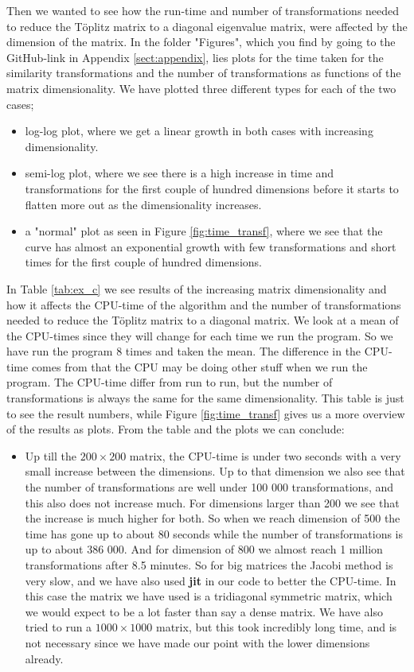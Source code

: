 \documentclass[12pt,a4paper,english]{article}
\begin{document}
Then we wanted to see how the run-time and number of transformations needed to reduce the Töplitz matrix to a diagonal eigenvalue matrix, were affected by the dimension of the matrix. In the folder "Figures", which you find by going to the GitHub-link in Appendix \ref{sect:appendix}, lies plots for the time taken for the similarity transformations and the number of transformations as functions of the matrix dimensionality. We have plotted three different types for each of the two cases; 
\begin{itemize}
	\item log-log plot, where we get a linear growth in both cases with increasing dimensionality.
	\item semi-log plot, where we see there is a high increase in time and transformations for the first couple of hundred dimensions before it starts to flatten more out as the dimensionality increases.
	\item a "normal" plot as seen in Figure \ref{fig:time_transf}, where we see that the curve has almost an exponential growth with few transformations and short times for the first couple of hundred dimensions.
\end{itemize}
In Table \ref{tab:ex_c} we see results of the increasing matrix dimensionality and how it affects the CPU-time of the algorithm and the number of transformations needed to reduce the Töplitz matrix to a diagonal matrix. We look at a mean of the CPU-times since they will change for each time we run the program. So we have run the program 8 times and taken the mean. The difference in the CPU-time comes from that the CPU may be doing other stuff when we run the program. The CPU-time differ from run to run, but the number of transformations is always the same for the same dimensionality. This table is just to see the result numbers, while Figure \ref{fig:time_transf} gives us a more overview of the results as plots. From the table and the plots we can conclude:
\begin{itemize}
	\item Up till the $200\times200$ matrix, the CPU-time is under two seconds with a very small increase between the dimensions. Up to that dimension we also see that the number of transformations are well under 100 000 transformations, and this also does not increase much. For dimensions larger than 200 we see that the increase is much higher for both. So when we reach dimension of 500 the time has gone up to about 80 seconds while the number of transformations is up to about 386 000. And for dimension of 800 we almost reach 1 million transformations after 8.5 minutes. So for big matrices the Jacobi method is very slow, and we have also used \textbf{jit} in our code to better the CPU-time. In this case the matrix we have used is a tridiagonal symmetric matrix, which we would expect to be a lot faster than say a dense matrix. We have also tried to run a $1000\times1000$ matrix, but this took incredibly long time, and is not necessary since we have made our point with the lower dimensions already.
\end{itemize}
\end{document}
